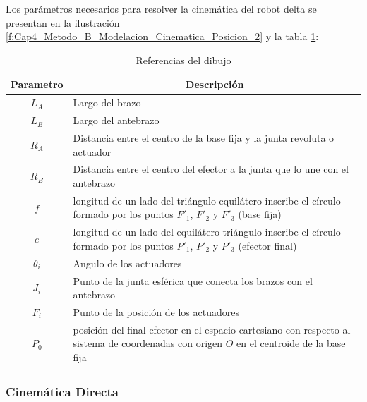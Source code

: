         
        Los parámetros necesarios para resolver la cinemática del robot delta se presentan en la ilustración \ref{f:Cap4_Metodo_B_Modelacion_Cinematica_Posicion_2} y la  tabla \ref{tab:cap4_tabla_12}:
        
        \begingroup
            \renewcommand{\arraystretch}{1.5}
            \begin{table}[H]
            \centering
            \begin{tabular}{c m{12cm}}
               \hline
               \textbf{Parametro}  & \multicolumn{1}{c}{\textbf{Descripción}}  \\
               \hline           \hline            
             $L_A$ & Largo del brazo \\
            \hline
             $L_B$ & Largo del antebrazo \\
            \hline
             $R_A$ & Distancia entre el centro de la base fija y la junta revoluta o actuador \\
            \hline
             $R_B$ & Distancia entre el centro del efector a la junta que lo une con el antebrazo\\
            \hline
             $f$ & longitud de un lado del triángulo equilátero inscribe el círculo formado por los puntos $F'_1$, $F'_2$ y $F'_3$ (base fija)\\
            \hline
             $e$ & longitud de un lado del equilátero triángulo inscribe el círculo formado por los puntos $P'_1$, $P'_2$ y $P'_3$ (efector final)\\
            \hline
             $\theta_i$ & Angulo de los actuadores\\
            \hline
             $J_i$ & Punto de la junta esférica que conecta los brazos con el antebrazo\\
            \hline            
             $F_i$ & Punto de la posición de los actuadores\\
            \hline  
             $P_0$ & posición del final efector en el espacio cartesiano con respecto al sistema de coordenadas con origen $O$ en el centroide de la base fija\\
            \hline            
            \end{tabular}
            \caption{Referencias del dibujo}
           \label{tab:cap4_tabla_12}
        \end{table}
        \endgroup     
        
        
        \newpage

\subsubsection{Cinemática Directa}\label{mb_cd}
        
